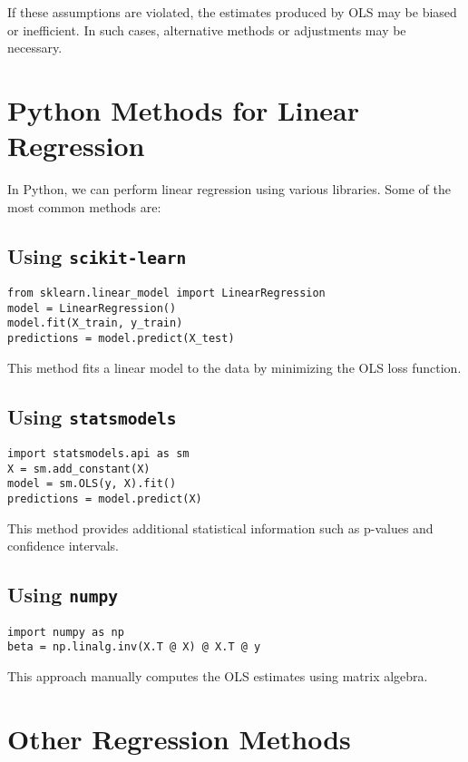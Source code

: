 \documentclass{article}
\begin{document}
If these assumptions are violated, the estimates produced by OLS may be biased or inefficient. In such cases, alternative methods or adjustments may be necessary.

\newpage
\section{Python Methods for Linear Regression}

In Python, we can perform linear regression using various libraries. Some of the most common methods are:

\subsection{Using \texttt{scikit-learn}}

\begin{verbatim}
from sklearn.linear_model import LinearRegression
model = LinearRegression()
model.fit(X_train, y_train)
predictions = model.predict(X_test)
\end{verbatim}

This method fits a linear model to the data by minimizing the OLS loss function.

\subsection{Using \texttt{statsmodels}}

\begin{verbatim}
import statsmodels.api as sm
X = sm.add_constant(X)
model = sm.OLS(y, X).fit()
predictions = model.predict(X)
\end{verbatim}

This method provides additional statistical information such as p-values and confidence intervals.

\subsection{Using \texttt{numpy}}

\begin{verbatim}
import numpy as np
beta = np.linalg.inv(X.T @ X) @ X.T @ y
\end{verbatim}

This approach manually computes the OLS estimates using matrix algebra.

\newpage
\section{Other Regression Methods}
\end{document}
